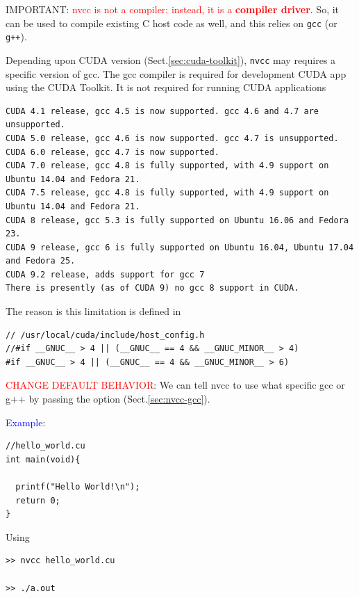\begin{mdframed}

IMPORTANT: \textcolor{red}{nvcc is not a compiler; instead, it is a {\bf
compiler driver}}.  So, it can be used to compile existing C host code as well,
and this relies on \verb!gcc! (or \verb!g++!).

Depending upon CUDA version (Sect.\ref{sec:cuda-toolkit}), \verb!nvcc! may
requires a specific version of gcc. The gcc compiler is required for development CUDA app
using the CUDA Toolkit. It is not required for running CUDA applications

\begin{verbatim}
CUDA 4.1 release, gcc 4.5 is now supported. gcc 4.6 and 4.7 are unsupported.
CUDA 5.0 release, gcc 4.6 is now supported. gcc 4.7 is unsupported.
CUDA 6.0 release, gcc 4.7 is now supported.
CUDA 7.0 release, gcc 4.8 is fully supported, with 4.9 support on Ubuntu 14.04 and Fedora 21.
CUDA 7.5 release, gcc 4.8 is fully supported, with 4.9 support on Ubuntu 14.04 and Fedora 21.
CUDA 8 release, gcc 5.3 is fully supported on Ubuntu 16.06 and Fedora 23.
CUDA 9 release, gcc 6 is fully supported on Ubuntu 16.04, Ubuntu 17.04 and Fedora 25.
CUDA 9.2 release, adds support for gcc 7
There is presently (as of CUDA 9) no gcc 8 support in CUDA.
\end{verbatim}

The reason is this limitation is defined in 
\begin{verbatim}
// /usr/local/cuda/include/host_config.h
//#if __GNUC__ > 4 || (__GNUC__ == 4 && __GNUC_MINOR__ > 4)
#if __GNUC__ > 4 || (__GNUC__ == 4 && __GNUC_MINOR__ > 6)
\end{verbatim}

\textcolor{red}{CHANGE DEFAULT BEHAVIOR}:
We can tell nvcc to use what specific gcc or g++ by passing the 
option  (Sect.\ref{sec:nvcc-gcc}).

\end{mdframed}

\textcolor{blue}{Example}:
\begin{verbatim}
//hello_world.cu
int main(void){

  printf("Hello World!\n");
  return 0;
}
\end{verbatim}
Using
\begin{verbatim}
>> nvcc hello_world.cu

>> ./a.out
\end{verbatim}


